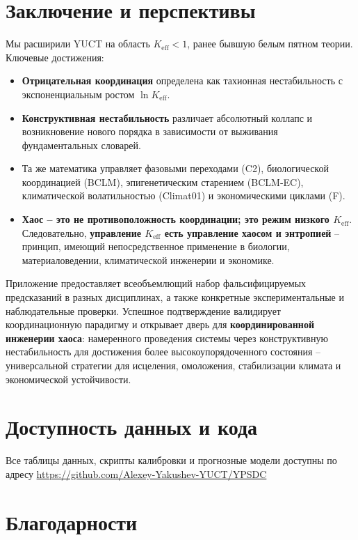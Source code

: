 \documentclass[12pt,a4paper]{article}
\newcommand{\Keff}{K_{\mathrm{eff}}}
\begin{document}
	\section{Заключение и перспективы}
	
	Мы расширили YUCT на область $\Keff < 1$, ранее бывшую белым пятном теории. Ключевые достижения:
	
	\begin{itemize}
		\item \textbf{Отрицательная координация} определена как тахионная нестабильность с экспоненциальным
		ростом $\ln \Keff$.
		\item \textbf{Конструктивная нестабильность} различает абсолютный коллапс и возникновение нового порядка
		в зависимости от выживания фундаментальных словарей.
		\item Та же математика управляет фазовыми переходами (C2), биологической координацией (BCLM),
		эпигенетическим старением (BCLM‑EC), климатической волатильностью (Climat01) и экономическими циклами (F).
		\item \textbf{Хаос – это не противоположность координации; это режим низкого $\Keff$}.
		Следовательно, \textbf{управление $\Keff$ есть управление хаосом и энтропией} –
		принцип, имеющий непосредственное применение в биологии, материаловедении, климатической
		инженерии и экономике.
	\end{itemize}
	
	Приложение предоставляет всеобъемлющий набор фальсифицируемых предсказаний в разных дисциплинах,
	а также конкретные экспериментальные и наблюдательные проверки. Успешное подтверждение
	валидирует координационную парадигму и открывает дверь для \textbf{координированной инженерии хаоса}:
	намеренного проведения системы через конструктивную нестабильность для достижения более
	высокоупорядоченного состояния – универсальной стратегии для исцеления, омоложения,
	стабилизации климата и экономической устойчивости.
	
	\section*{Доступность данных и кода}
	
	Все таблицы данных, скрипты калибровки и прогнозные модели доступны по адресу
	\url{https://github.com/Alexey-Yakushev-YUCT/YPSDC}
	
	\section*{Благодарности}
	
\end{document}
